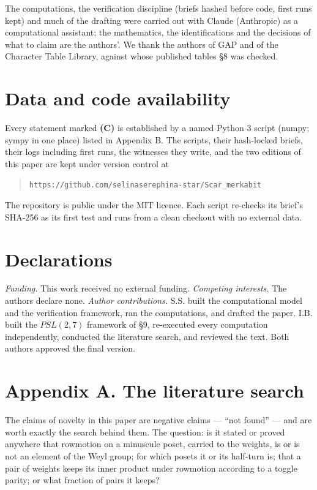 \documentclass[
]{article}
\newcounter{none} %
\begin{document}
The computations, the verification discipline (briefs hashed before
code, first runs kept) and much of the drafting were carried out with
Claude (Anthropic) as a computational assistant; the mathematics, the
identifications and the decisions of what to claim are the authors'. We
thank the authors of GAP and of the Character Table Library, against
whose published tables §8 was checked.

\section{Data and code availability}\label{data-and-code-availability}

Every statement marked \textbf{(C)} is established by a named Python 3
script (numpy; sympy in one place) listed in Appendix B. The scripts,
their hash-locked briefs, their logs including first runs, the witnesses
they write, and the two editions of this paper are kept under version
control at

\begin{quote}
\texttt{https://github.com/selinaserephina-star/Scar\_merkabit}
\end{quote}

The repository is public under the MIT licence. Each script re-checks
its brief's SHA-256 as its first test and runs from a clean checkout
with no external data.

\section{Declarations}\label{declarations}

\emph{Funding.} This work received no external funding. \emph{Competing
interests.} The authors declare none. \emph{Author contributions.} S.S.
built the computational model and the verification framework, ran the
computations, and drafted the paper. I.B. built the \(PSL(2,7)\)
framework of §9, re-executed every computation independently, conducted
the literature search, and reviewed the text. Both authors approved the
final version.

\section{Appendix A. The literature
search}\label{appendix-a.-the-literature-search}

The claims of novelty in this paper are negative claims --- ``not
found'' --- and are worth exactly the search behind them. The question:
is it stated or proved anywhere that rowmotion on a minuscule poset,
carried to the weights, is or is not an element of the Weyl group; for
which posets it or its half-turn is; that a pair of weights keeps its
inner product under rowmotion according to a toggle parity; or what
fraction of pairs it keeps?
\end{document}

